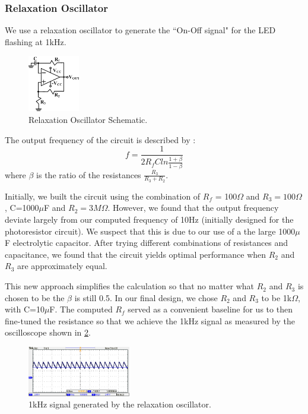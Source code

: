 \documentclass[authoryear, 12pt,5p, times]{elsarticle}
\begin{document}
\subsubsection{Relaxation Oscillator}
We use a relaxation oscillator to generate the ``On-Off signal" for the LED flashing at 1kHz.
\begin{figure}[h!]
 \centering
 \includegraphics[width=0.2\textwidth]{figure/relax_osc.png}
\caption{Relaxation Oscillator Schematic.}
\label{relax_osc}
\end{figure}
The output frequency of the circuit is described by :
\begin{equation}
f=\frac{1}{2 R_f C ln\frac{1+\beta}{1-\beta}}
\end{equation}
where $\beta$ is the ratio of the resistances $\frac{R_3}{R_3+R_2}$.
\par Initially, we built the circuit using the combination of $R_f$ = 100$\Omega$ and $R_3 = 100\Omega$, C=1000$\mu$F and $R_2 = 3 M\Omega$. However, we found that the output frequency deviate largely from our computed frequency of 10Hz (initially designed for the photoresistor circuit). We suspect that this is due to our use of a the large 1000$\mu$F electrolytic capacitor. After trying different combinations of resistances and capacitance, we found that the circuit yields optimal performance when $R_2$ and $R_3$ are approximately equal. %
\par This new approach simplifies the calculation so that no matter what $R_2$ and $R_3$ is chosen to be the $\beta$ is still 0.5. In our final design, we chose $R_2$ and $R_3$ to be 1k$\Omega$, with C=10$\mu$F. The computed $R_f$ served as a convenient baseline for us to then fine-tuned the resistance so that we achieve the 1kHz signal as measured by the oscilloscope shown in \ref{relax_osc_b4boost}.
\begin{figure}[h!]
 \centering
 \includegraphics[width=0.4\textwidth]{figure/relax_osc_beforeboost.png}
\caption{1kHz signal generated by the relaxation oscillator.}
\label{relax_osc_b4boost}
\end{figure}
\end{document}
